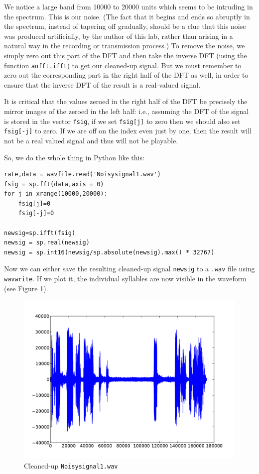 We notice a large band from 10000 to 20000 units which seems to be intruding in the spectrum. This is our noise. (The fact that it begins and ends so abruptly in the spectrum, instead of tapering off gradually, should be a clue that this noise was produced artificially, by the author of this lab, rather than arising in a natural way in the recording or transmission process.) To remove the noise, we simply zero out this part of the DFT and then take the inverse DFT (using the function \texttt{anfft.ifft}) to get our cleaned-up signal. But we must remember to zero out the corresponding part in the right half of the DFT as well, in order to ensure that the inverse DFT of the result is a real-valued signal.

It is critical that the values zeroed in the right half of the DFT be precisely the mirror images of the zeroed in the left half: i.e., assuming the DFT of the signal is stored in the vector \texttt{fsig}, if we set \texttt{fsig[j]} to zero then we should also set \texttt{fsig[-j]} to zero. If we are off on the index even just by one, then the result will not be a real valued signal and thus will not be playable.

So, we do the whole thing in Python like this:
\begin{lstlisting}
rate,data = wavfile.read('Noisysignal1.wav')
fsig = sp.fft(data,axis = 0)
for j in xrange(10000,20000):
    fsig[j]=0
    fsig[-j]=0

newsig=sp.ifft(fsig)
newsig = sp.real(newsig)
newsig = sp.int16(newsig/sp.absolute(newsig).max() * 32767)
\end{lstlisting}

Now we can either save the resulting cleaned-up signal \texttt{newsig} to a \texttt{.wav} file using \texttt{wavwrite}. If we plot it, the individual syllables are now visible in the waveform (see Figure \ref{cleansignal}).

\begin{figure}[ht]\caption{Cleaned-up \texttt{Noisysignal1.wav} }\label{cleansignal}\centering\includegraphics[width=\textwidth]{Cleanedsignal}\end{figure}

